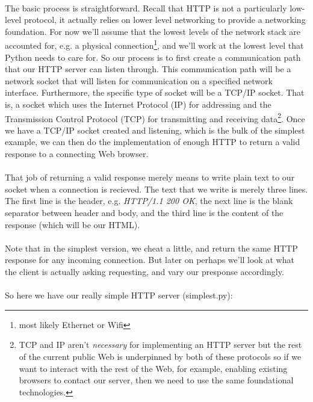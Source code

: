 \paragraph{} The basic process is straightforward. Recall that HTTP is not a particularly low-level protocol, it actually relies on lower level networking to provide a networking foundation. For now we'll assume that the lowest levels of the network stack are accounted for, e.g. a physical connection\footnote{most likely Ethernet or Wifi}, and we'll work at the lowest level that Python needs to care for. So our process is to first create a communication path that our HTTP server can listen through. This communication path will be a network socket that will listen for communication on a specified network interface. Furthermore, the specific type of socket will be a TCP/IP socket. That is, a socket which uses the Internet Protocol (IP) for addressing and the Transmission Control Protocol (TCP) for transmitting and receiving data\footnote{TCP and IP aren't \emph{necessary} for implementing an HTTP server but the rest of the current public Web is underpinned by both of these protocols so if we want to interact with the rest of the Web, for example, enabling existing browsers to contact our server, then we need to use the same foundational technologies.}. Once we have a TCP/IP socket created and listening, which is the bulk of the simplest example, we can then do the implementation of enough HTTP to return a valid response to a connecting Web browser.

\paragraph{} That job of returning a valid response merely means to write plain text to our socket when a connection is recieved. The text that we write is merely three lines. The first line is the header, e.g. \emph{HTTP/1.1 200 OK}, the next line is the blank separator between header and body, and the third line is the content of the response (which will be our HTML).

\paragraph{} Note that in the simplest version, we cheat a little, and return the same HTTP response for any incoming connection. But later on perhaps we'll look at what the client is actually asking requesting, and vary our presponse accordingly.

\paragraph{} So here we have our really simple HTTP server (simplest.py):

